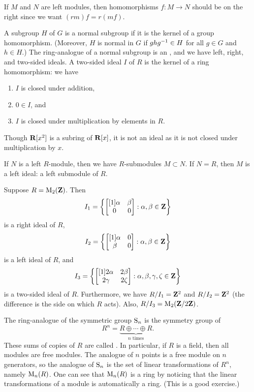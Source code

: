 \documentclass[11pt, oneside,margin=1in]{article}
\begin{document}
If $M$ and $N$ are left modules, then homomorphisms $f: M\longrightarrow N$ should be on the right since we want $(rm)f = r(mf)$. 

A subgroup $H$ of $G$ is a normal subgroup if it is the kernel of a group homomorphism. (Moreover, $H$ is normal in $G$ if $ghg^{-1} \in H$ for all $g\in G$ and $h\in H$.) The ring-analogue of a normal subgroup is an , and we have left, right, and two-sided ideals. A two-sided ideal $I$ of $R$ is the kernel of a ring homomorphism: we have
\begin{enumerate}
\item $I$ is closed under addition,
\item $0\in I$, and
\item $I$ is closed under multiplication by elements in $R$.
\end{enumerate}
\begin{example}
Though $\mathbf R[x^2]$ is a subring of $\mathbf R[x]$, it is not an ideal as it is not closed under multiplication by $x$.
\end{example}

If $N$ is a left $R$-module, then we have $R$-submodules $M\subset N$. If $N=R$, then $M$ is a left ideal: a left submodule of $R$.

\begin{example}
Suppose $R = \operatorname{M}_2(\mathbf Z)$. Then 
\[
I_1 = \left\{ \begin{bmatrix} [1] \alpha&\beta\\ 0&0\end{bmatrix} : \alpha,\beta\in \mathbf Z\right\}
\]
is a right ideal of $R$, 
\[
I_2 =\left\{ \begin{bmatrix} [1] \alpha&0\\ \beta&0\end{bmatrix} : \alpha,\beta\in\mathbf Z\right\}
\]
is a left ideal of $R$, and
\[
I_3 =\left\{ \begin{bmatrix} [1] 2\alpha & 2\beta\\ 2\gamma&2\zeta\end{bmatrix}: \alpha,\beta,\gamma,\zeta \in \mathbf Z\right\}
\]
is a two-sided ideal of $R$. Furthermore, we have $R/I_1 = \mathbf Z^2$ and $R/I_2 = \mathbf Z^2$ (the difference is the side on which $R$ acts). Also, $R/I_3 = \operatorname{M}_2(\mathbf Z / 2\mathbf Z)$.
\end{example}

The ring-analogue of the symmetric group $\operatorname{S}_n$ is the symmetry group of
\[
R^n = \underbrace{R \oplus \cdots\oplus R}_{n\textrm{ times}}.
\]
These sums of copies of $R$ are called . In particular, if $R$ is a field, then all modules are free modules. The analogue of $n$ points is a free module on $n$ generators, so the analogue of $\operatorname{S}_n$ is the set of linear transformations of $R^n$, namely $\operatorname{M}_n(R)$. One can see that $\operatorname{M}_n(R)$ is a ring by noticing that the linear transformations of a module is automatically a ring. (This is a good exercise.)
\end{document}
